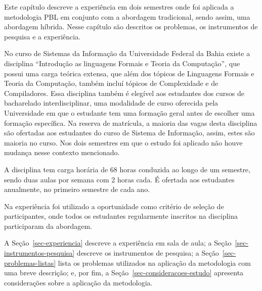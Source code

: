 
\label{cap-estudo}
\acresetall
Este capítulo descreve a experiência em dois semestres onde foi aplicada a metodologia PBL
em conjunto com a abordagem tradicional, sendo assim, uma abordagem híbrida.
Nesse capítulo são descritos os problemas, os instrumentos de pesquisa e a
experiência.

No curso de Sistemas da Informação da Universidade Federal da Bahia existe
a disciplina ``Introdução as linguagens Formais e Teoria da Computação'',
que possui uma carga teórica extensa, que além dos tópicos de Linguagens Formais e Teoria
da Computação, também incluí tópicos de Complexidade e de Compiladores.
Essa disciplina também é elegível aos estudantes dos cursos de bacharelado
interdisciplinar, uma modalidade de curso oferecida pela Universidade
em que o estudante tem uma formação geral antes de escolher
uma formação específica.
Na reserva de matrícula, a maioria das vagas desta disciplina são ofertadas aos
estudantes do curso de Sistema de Informação, assim, estes são maioria no curso.
Nos dois semestres em que o estudo foi aplicado não houve mudança nesse
contexto mencionado.

A disciplina tem carga horária de 68 horas conduzida ao longo de um semestre, sendo duas
aulas por semana com 2 horas cada.
É ofertada aos estudantes anualmente, no primeiro semestre de cada ano.

Na experiência foi utilizado a oportunidade como critério de seleção de participantes, onde todos os
estudantes regularmente inscritos na disciplina participaram da abordagem.

A Seção~\ref{sec-experiencia} descreve a experiência em sala de aula;
a Seção~\ref{sec-instrumentos-pesquisa} descreve os instrumentos de pesquisa;
a Seção~\ref{sec-problemas-listas} lista os problemas utilizados
na aplicação da metodologia com uma breve
descrição;
e, por fim, a Seção~\ref{sec-consideracoes-estudo} apresenta
considerações sobre a aplicação da metodologia.





